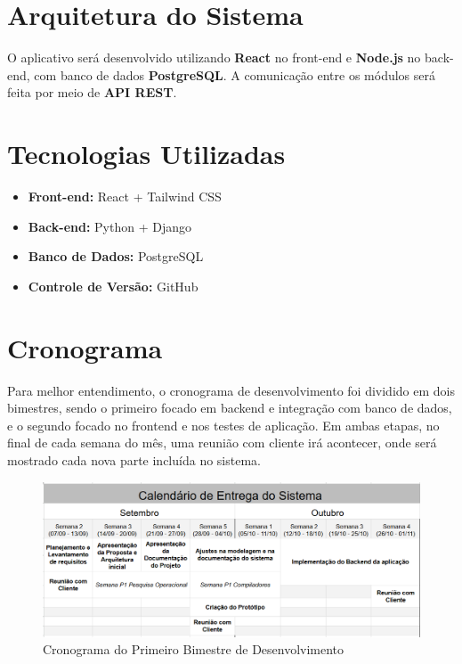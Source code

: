 \documentclass[12pt,a4paper]{report}
\begin{document}
\chapter{Arquitetura do Sistema}
O aplicativo será desenvolvido utilizando \textbf{React} no front-end e \textbf{Node.js} no back-end, com banco de dados \textbf{PostgreSQL}.  
A comunicação entre os módulos será feita por meio de \textbf{API REST}.



\chapter{Tecnologias Utilizadas}
\begin{itemize}
    \item \textbf{Front-end:} React + Tailwind CSS
    \item \textbf{Back-end:} Python + Django
    \item \textbf{Banco de Dados:} PostgreSQL
    \item \textbf{Controle de Versão:} GitHub
\end{itemize}

\chapter{Cronograma}
\label{sec:cronograma}

Para melhor entendimento, o cronograma de desenvolvimento foi dividido em dois bimestres, sendo o primeiro focado em backend e integração com banco de dados, e o segundo focado no frontend e nos testes de aplicação. Em ambas etapas, no final de cada semana do mês, uma reunião com cliente irá acontecer, onde será mostrado cada nova parte incluída no sistema.  

\vspace{2cm}

\begin{figure}[!h]
\centering
\includegraphics[width = \linewidth]{imagens/Calendario1bi.png}
\caption{Cronograma do Primeiro Bimestre de Desenvolvimento}
\label{Cronograma do Primeiro Bimestre de Desenvolvimento}
\end{figure}
\end{document}
